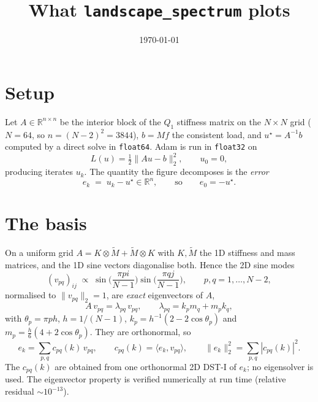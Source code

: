 \documentclass[11pt]{article}
\title{What \texttt{landscape\_spectrum} plots}
\date{\today}
\begin{document}
\maketitle

\section*{Setup}

Let $A\in\mathbb R^{n\times n}$ be the interior block of the $Q_1$ stiffness matrix on the
$N\times N$ grid ($N=64$, so $n=(N-2)^2=3844$), $b=Mf$ the consistent load, and
$u^\star=A^{-1}b$ computed by a direct solve in \texttt{float64}. Adam is run in \texttt{float32}
on
\begin{equation*}
   L(u)=\tfrac12\|Au-b\|_2^2, \qquad u_0=0,
\end{equation*}
producing iterates $u_k$. The quantity the figure decomposes is the \emph{error}
\begin{equation*}
   e_k \;=\; u_k-u^\star \in\mathbb R^n ,
   \qquad\text{so}\qquad e_0=-u^\star .
\end{equation*}

\section*{The basis}

On a uniform grid $A=K\otimes\tilde M+\tilde M\otimes K$ with $K,\tilde M$ the 1D stiffness and
mass matrices, and the 1D sine vectors diagonalise both. Hence the 2D sine modes
\begin{equation*}
   (v_{pq})_{ij}\;\propto\;\sin\!\Big(\frac{\pi p i}{N-1}\Big)\sin\!\Big(\frac{\pi q j}{N-1}\Big),
   \qquad p,q=1,\dots,N-2,
\end{equation*}
normalised to $\|v_{pq}\|_2=1$, are \emph{exact} eigenvectors of $A$,
\begin{equation*}
   A\,v_{pq}=\lambda_{pq}\,v_{pq},
   \qquad
   \lambda_{pq}=k_pm_q+m_pk_q,
\end{equation*}
with $\theta_p=\pi p h$, $h=1/(N-1)$, $k_p=h^{-1}(2-2\cos\theta_p)$ and
$m_p=\tfrac{h}{6}(4+2\cos\theta_p)$. They are orthonormal, so
\begin{equation*}
   e_k=\sum_{p,q}c_{pq}(k)\,v_{pq},
   \qquad
   c_{pq}(k)=\langle e_k,v_{pq}\rangle,
   \qquad
   \|e_k\|_2^2=\sum_{p,q}|c_{pq}(k)|^2 .
\end{equation*}
The $c_{pq}(k)$ are obtained from one orthonormal 2D DST-I of $e_k$; no eigensolver is used. The
eigenvector property is verified numerically at run time (relative residual $\sim10^{-13}$).
\end{document}
